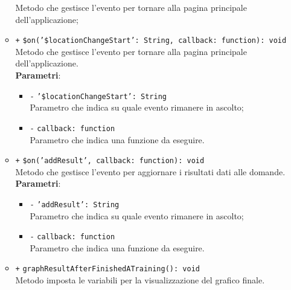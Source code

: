 \begin{itemize}
\begin{itemize}
		Metodo che gestisce l'evento per tornare alla pagina principale dell'applicazione;  
		\item \texttt{+} \texttt{\$on('\$locationChangeStart': String, callback: function): void} \\
		Metodo che gestisce l'evento per tornare alla pagina principale dell'applicazione.\\
		\textbf{Parametri}:
		\begin{itemize}
			  	\item \texttt{-} \texttt{'\$locationChangeStart': String} \\
			  	Parametro che indica su quale evento rimanere in ascolto;
			  	\item \texttt{-} \texttt{callback: function} \\
			  	Parametro che indica una funzione da eseguire.
		\end{itemize}
		\item \texttt{+} \texttt{\$on('addResult', callback: function): void} \\
		Metodo che gestisce l'evento per aggiornare i risultati dati alle domande. \\
		\textbf{Parametri}:
		\begin{itemize}
			\item \texttt{-} \texttt{'addResult': String} \\
			Parametro che indica su quale evento rimanere in ascolto;
			\item \texttt{-} \texttt{callback: function} \\
			Parametro che indica una funzione da eseguire.
		\end{itemize}
		\item \texttt{+} \texttt{graphResultAfterFinishedATraining(): void} \\
		Metodo imposta le variabili per la visualizzazione del grafico finale. 
	\end{itemize}
\end{itemize}

